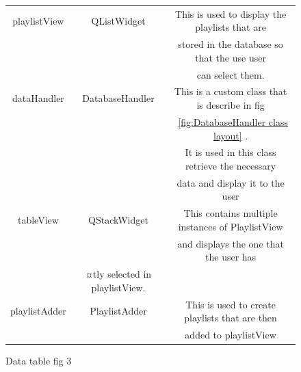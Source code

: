 \documentclass{article}
\begin{document}
\begin{figure}[H]
\begin{center}
\begin{tabular} { | c | c | c |}
            playlistView      & QListWidget  &This is used to display the playlists that are  \\
                                             &&stored in the database so that the use user    \\
                                             &&can select them.                               \\ \hline
            dataHandler      &DatabaseHandler&This is a custom class that is describe in fig  \\
                                             &&~\ref{fig:DatabaseHandler class layout} .      \\
                                             &&It is used in this class retrieve the necessary \\
                                             &&data and display it to the user                \\ \hline
            tableView         &QStackWidget  &This contains multiple instances of PlaylistView\\
                                             &&and displays the one that the user has         \\
                                             &¤tly selected in playlistView.            \\ \hline
            playlistAdder     & PlaylistAdder&This is used to create playlists that are then  \\
                                             &&added to playlistView                          \\ \hline
        \end{tabular}
    \end{center}
    \caption{Data table fig 3} \label{fig:dataTable3}
\end{figure}
\end{document}
